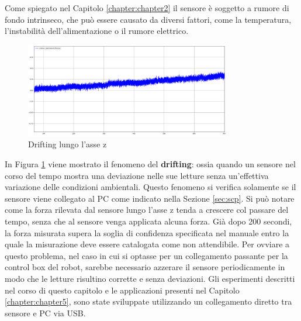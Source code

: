 Come spiegato nel Capitolo \ref{chapter:chapter2} il sensore \`{e} soggetto a rumore di fondo intrinseco, che 
pu\`{o} essere causato da diversi fattori, come la temperatura, l'instabilit\`{a} dell'alimentazione o il rumore elettrico. 
\begin{figure}[H]
    \centering
    \includegraphics*[width=0.80\textwidth]{images/drifting.png}
    \caption{Drifting lungo l'asse z}
    \label{fig:drifting}
\end{figure}
In Figura \ref{fig:drifting} viene mostrato il fenomeno del \textbf{drifting}: ossia quando un sensore nel corso del tempo 
mostra una deviazione nelle sue letture senza un'effettiva variazione delle condizioni ambientali. Questo fenomeno si verifica 
solamente se il sensore viene collegato al PC come indicato nella Sezione \ref{sec:scp}. 
Si pu\`{o} notare come la forza rilevata dal sensore lungo l'asse z tenda a crescere col passare del tempo, senza che al sensore 
venga applicata alcuna forza. Gi\`{a} dopo 200 secondi, la forza misurata supera la soglia di confidenza specificata nel manuale 
entro la quale la misurazione deve essere catalogata come non attendibile.
Per ovviare a questo problema, nel caso in cui si optasse per un collegamento passante per la control box del robot, 
sarebbe necessario azzerare il sensore periodicamente in modo che le letture risultino corrette e senza deviazioni. 
Gli esperimenti descritti nel corso di questo capitolo e le applicazioni presenti nel Capitolo \ref{chapter:chapter5}, sono state 
sviluppate utilizzando un collegamento diretto tra sensore e PC via USB.
